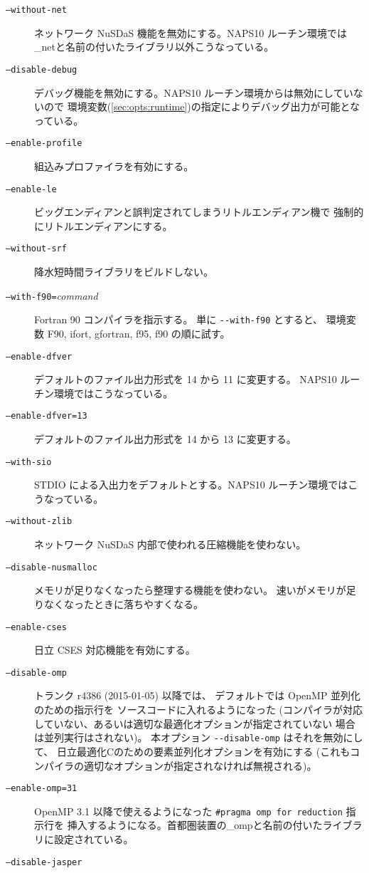 \begin{description}
\item[{\tt --without-net}]
ネットワーク NuSDaS 機能を無効にする。NAPS10 ルーチン環境では
\_netと名前の付いたライブラリ以外こうなっている。
\item[{\tt --disable-debug}]
デバッグ機能を無効にする。NAPS10 ルーチン環境からは無効にしていないので
環境変数(\ref{sec:opts:runtime})の指定によりデバッグ出力が可能となっている。
\item[{\tt --enable-profile}]
組込みプロファイラを有効にする。
\item[{\tt --enable-le}]
ビッグエンディアンと誤判定されてしまうリトルエンディアン機で
強制的にリトルエンディアンにする。
\item[{\tt --without-srf}]
降水短時間ライブラリをビルドしない。
\item[{\tt --with-f90=}{\it command}]
Fortran 90 コンパイラを指示する。
単に \verb|--with-f90| とすると、
環境変数 F90, ifort, gfortran, f95, f90 の順に試す。
\item[{\tt --enable-dfver}]
デフォルトのファイル出力形式を 14 から 11 に変更する。
NAPS10 ルーチン環境ではこうなっている。
\item[{\tt --enable-dfver=13}]
デフォルトのファイル出力形式を 14 から 13 に変更する。
\item[{\tt --with-sio}]
STDIO による入出力をデフォルトとする。NAPS10 ルーチン環境ではこうなっている。
\item[{\tt --without-zlib}]
ネットワーク NuSDaS 内部で使われる圧縮機能を使わない。
\item[{\tt --disable-nusmalloc}]
メモリが足りなくなったら整理する機能を使わない。
速いがメモリが足りなくなったときに落ちやすくなる。
\item[{\tt --enable-cses}]
日立 CSES 対応機能を有効にする。
\item[{\tt --disable-omp}]
トランク r4386 (2015-01-05) 以降では、
デフォルトでは OpenMP 並列化のための指示行を
ソースコードに入れるようになった
(コンパイラが対応していない、あるいは適切な最適化オプションが指定されていない
場合は並列実行はされない)。
本オプション \verb|--disable-omp| はそれを無効にして、
日立最適化Cのための要素並列化オプションを有効にする
(これもコンパイラの適切なオプションが指定されなければ無視される)。
\item[{\tt --enable-omp=31}]
OpenMP 3.1 以降で使えるようになった \verb|#pragma omp for reduction| 指示行を
挿入するようになる。首都圏装置の\_ompと名前の付いたライブラリに設定されている。
\item[{\tt --disable-jasper}]

\end{description}
